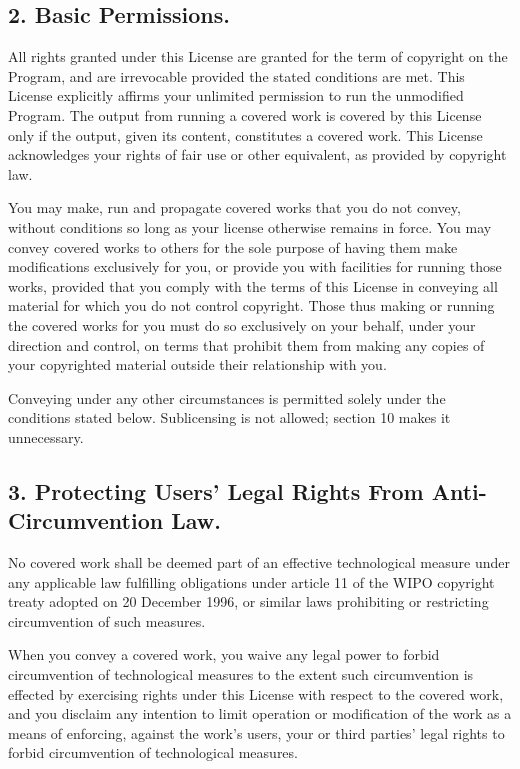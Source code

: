 \subsection{2. Basic Permissions.}
All rights granted under this License are granted for the term of copyright on the Program, and are irrevocable provided the stated conditions are met. This License explicitly affirms your unlimited permission to run the unmodified Program. The output from running a covered work is covered by this License only if the output, given its content, constitutes a covered work. This License acknowledges your rights of fair use or other equivalent, as provided by copyright law.\par
You may make, run and propagate covered works that you do not convey, without conditions so long as your license otherwise remains in force. You may convey covered works to others for the sole purpose of having them make modifications exclusively for you, or provide you with facilities for running those works, provided that you comply with the terms of this License in conveying all material for which you do not control copyright. Those thus making or running the covered works for you must do so exclusively on your behalf, under your direction and control, on terms that prohibit them from making any copies of your copyrighted material outside their relationship with you.\par
Conveying under any other circumstances is permitted solely under the conditions stated below. Sublicensing is not allowed; section 10 makes it unnecessary.
\subsection{3. Protecting Users' Legal Rights From Anti-Circumvention Law.}
No covered work shall be deemed part of an effective technological measure under any applicable law fulfilling obligations under article 11 of the WIPO copyright treaty adopted on 20 December 1996, or similar laws prohibiting or restricting circumvention of such measures.\par
When you convey a covered work, you waive any legal power to forbid circumvention of technological measures to the extent such circumvention is effected by exercising rights under this License with respect to the covered work, and you disclaim any intention to limit operation or modification of the work as a means of enforcing, against the work's users, your or third parties' legal rights to forbid circumvention of technological measures.
